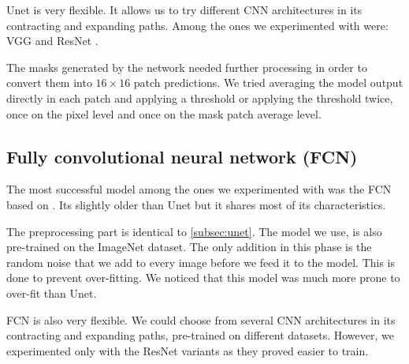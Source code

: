 Unet is very flexible. It allows us to try different CNN architectures in its contracting and expanding paths. Among the ones we experimented with were: VGG \cite{Zis14} and ResNet \cite{He15}.

The masks generated by the network needed further processing in order to convert them into $16 \times 16$ patch predictions. We tried averaging the model output directly in each patch and applying a threshold or applying the threshold twice, once on the pixel level and once on the mask patch average level.

\subsection{Fully convolutional neural network (FCN)} \label{subsec:fcn}
The most successful model among the ones we experimented with was the FCN based on \cite{Lon14}. Its slightly older than Unet but it shares most of its characteristics.

The preprocessing part is identical to \autoref{subsec:unet}. The model we use, is also pre-trained on the ImageNet dataset. The only addition in this phase is the random noise that we add to every image before we feed it to the model. This is done to prevent over-fitting. We noticed that this model was much more prone to over-fit than Unet.

FCN is also very flexible. We could choose from several CNN architectures in its contracting and expanding paths, pre-trained on different datasets. However, we experimented only with the ResNet variants as they proved easier to train.
